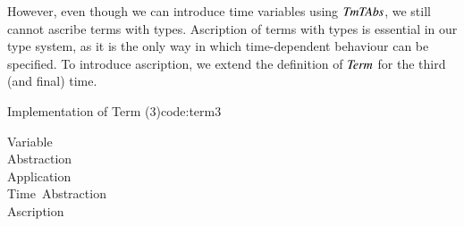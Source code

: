 However, even though we can introduce time variables using \ensuremath{\Conid{TmTAbs}}, we still cannot ascribe terms with types.
Ascription of terms with types is essential in our type system, as it is the only way in which time-dependent behaviour can be specified.
To introduce ascription, we extend the definition of \ensuremath{\Conid{Term}} for the third (and final) time.

\begin{texexptitled}{Implementation of Term (3)}{code:term3}
\begin{hscode}\SaveRestoreHook
{}%
%
%
%
%
%
\>[B]{}\;\<[13]%
\>[13]{}\mathrel{=}{}\<[13E]%
\>[17]{}\;\<[39]%
\>[39]{}\mbox{\onelinecomment  Variable}{}\<[E]%
\\
\>[13]{}\mid {}\<[13E]%
\>[17]{}\;\;\<[39]%
\>[39]{}\mbox{\onelinecomment  Abstraction }{}\<[E]%
\\
\>[13]{}\mid {}\<[13E]%
\>[17]{}\;\;\<[39]%
\>[39]{}\mbox{\onelinecomment  Application }{}\<[E]%
\\
\>[13]{}\mid {}\<[13E]%
\>[17]{}\;\;\<[39]%
\>[39]{}\mbox{\onelinecomment  Time Abstraction}{}\<[E]%
\\
\>[13]{}\mid {}\<[13E]%
\>[17]{}\;\;\<[39]%
\>[39]{}\mbox{\onelinecomment  Ascription}{}\<[E]%
\ColumnHook
\end{hscode}\resethooks
\end{texexptitled}

